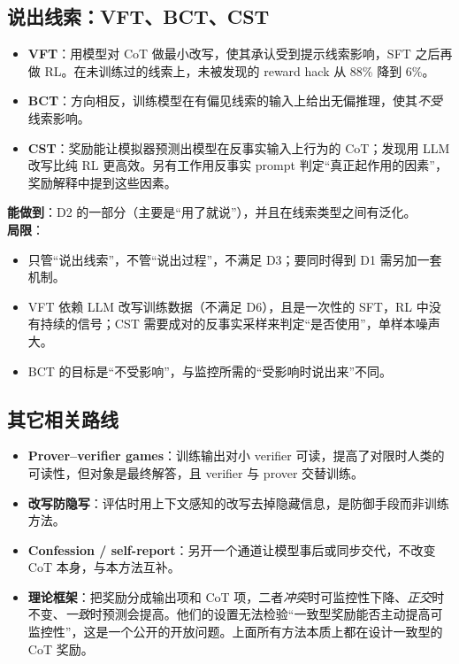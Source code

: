 \documentclass[11pt,a4paper]{ctexart}
\begin{document}
\subsection{说出线索：VFT、BCT、CST}
\begin{itemize}
\item \textbf{VFT}\cite{turpin2025}：用模型对 CoT 做最小改写，使其承认受到提示线索影响，SFT 之后再做 RL。在未训练过的线索上，未被发现的 reward hack 从 88\% 降到 6\%。
\item \textbf{BCT}\cite{chua2024}：方向相反，训练模型在有偏见线索的输入上给出无偏推理，使其\emph{不受}线索影响。
\item \textbf{CST}\cite{hase2026}：奖励能让模拟器预测出模型在反事实输入上行为的 CoT；发现用 LLM 改写比纯 RL 更高效。另有工作用反事实 prompt 判定“真正起作用的因素”，奖励解释中提到这些因素\cite{selfexpl2026}。
\end{itemize}
\textbf{能做到}：D2 的一部分（主要是“用了就说”），并且在线索类型之间有泛化。\\
\textbf{局限}：
\begin{itemize}
\item 只管“说出线索”，不管“说出过程”，不满足 D3；要同时得到 D1 需另加一套机制。
\item VFT 依赖 LLM 改写训练数据（不满足 D6），且是一次性的 SFT，RL 中没有持续的信号；CST 需要成对的反事实采样来判定“是否使用”，单样本噪声大。
\item BCT 的目标是“不受影响”，与监控所需的“受影响时说出来”不同。
\end{itemize}

\subsection{其它相关路线}
\begin{itemize}
\item \textbf{Prover–verifier games}\cite{kirchner2024}：训练输出对小 verifier 可读，提高了对限时人类的可读性，但对象是最终解答，且 verifier 与 prover 交替训练。
\item \textbf{改写防隐写}\cite{roger2023}：评估时用上下文感知的改写去掉隐藏信息，是防御手段而非训练方法。
\item \textbf{Confession / self-report}\cite{confessions2026,selfreport2026}：另开一个通道让模型事后或同步交代，不改变 CoT 本身，与本方法互补。
\item \textbf{理论框架}\cite{kaufmann2026}：把奖励分成输出项和 CoT 项，二者\emph{冲突}时可监控性下降、\emph{正交}时不变、\emph{一致}时预测会提高。他们的设置无法检验“一致型奖励能否主动提高可监控性”，这是一个公开的开放问题。上面所有方法本质上都在设计一致型的 CoT 奖励。
\end{itemize}
\end{document}
